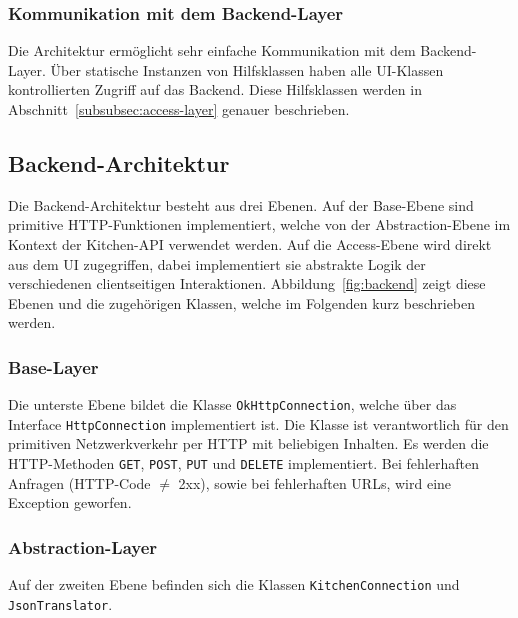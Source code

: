 \subsubsection{Kommunikation mit dem Backend-Layer}

Die Architektur ermöglicht sehr einfache Kommunikation mit dem Backend-Layer.
Über statische Instanzen von Hilfsklassen haben alle UI-Klassen kontrollierten Zugriff auf das Backend.
Diese Hilfsklassen werden in Abschnitt~\ref{subsubsec:access-layer} genauer beschrieben.

\subsection{Backend-Architektur}\label{subsec:backend}

Die Backend-Architektur besteht aus drei Ebenen.
Auf der Base-Ebene sind primitive HTTP-Funktionen implementiert,
welche von der Abstraction-Ebene im Kontext der Kitchen-API verwendet werden.
Auf die Access-Ebene wird direkt aus dem UI zugegriffen, dabei implementiert sie abstrakte Logik der verschiedenen clientseitigen Interaktionen.
Abbildung~\ref{fig:backend} zeigt diese Ebenen und die zugehörigen Klassen, welche im Folgenden kurz beschrieben werden.


\subsubsection{Base-Layer}

Die unterste Ebene bildet die Klasse \texttt{OkHttpConnection}, welche über das Interface \texttt{HttpConnection} implementiert ist.
Die Klasse ist verantwortlich für den primitiven Netzwerkverkehr per HTTP mit beliebigen Inhalten.
Es werden die HTTP-Methoden \texttt{GET}, \texttt{POST}, \texttt{PUT} und \texttt{DELETE} implementiert.
Bei fehlerhaften Anfragen (HTTP-Code $\neq$ 2xx), sowie bei fehlerhaften URLs, wird eine Exception geworfen.

\subsubsection{Abstraction-Layer}

Auf der zweiten Ebene befinden sich die Klassen \texttt{KitchenConnection} und \texttt{JsonTranslator}.

